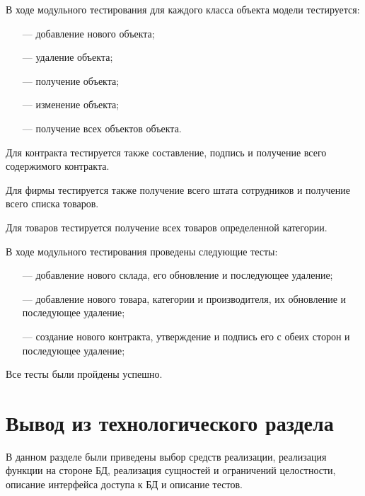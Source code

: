 В ходе модульного тестирования для каждого класса объекта модели тестируется:
\begin{itemize}
\item[---] добавление нового объекта;
\item[---] удаление объекта;
\item[---] получение объекта;
\item[---] изменение объекта;
\item[---] получение всех объектов объекта.
\end{itemize}

Для контракта тестируется также составление, подпись и получение всего содержимого контракта.

Для фирмы тестируется также получение всего штата сотрудников и получение всего списка товаров.

Для товаров тестируется получение всех товаров определенной категории.

В ходе модульного тестирования проведены следующие тесты:
\newpage
\begin{itemize}
	\item[---] добавление нового склада, его обновление и последующее удаление;
	\item[---] добавление нового товара, категории и производителя, их обновление и последующее удаление;
	\item[---] создание нового контракта, утверждение и подпись его с обеих сторон и последующее удаление;
\end{itemize}

Все тесты были пройдены успешно.

\section{Вывод из технологического раздела}
В данном разделе были приведены выбор средств реализации, реализация функции на стороне БД, реализация сущностей и ограничений целостности, описание интерфейса доступа к БД и описание тестов.